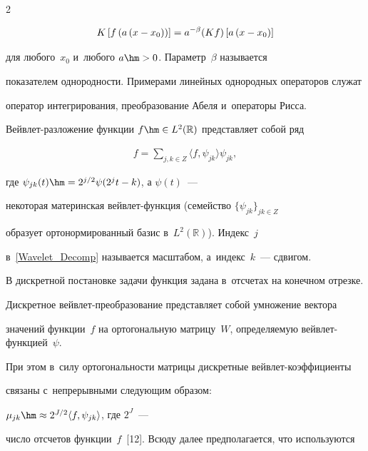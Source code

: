 \begin{multicols}{2}
  

 

  

  \noindent

\begin{equation}

K\left[f\left(a\left(x-x_0\right)\right)\right]=a^{-\beta}(Kf)\left[a\left(x-x_0\right)\right]\notag

\end{equation}

для любого~$x_0$ и~любого $a\hm>0$. Параметр~$\beta$ называется 

показателем однородности. Примерами линейных однородных операторов служат 

оператор интегрирования, преобразование Абеля и~операторы Рисса.



 Вейвлет-разложение функции $f\hm\in L^2(\mathbb{R})$ представляет собой ряд

\begin{align}

f=\sum\limits_{j,k\in Z}\langle f,\psi_{jk}\rangle\psi_{jk},

\label{Wavelet_Decomp}

\end{align}

где $\psi_{jk}(t)\hm=2^{j/2}\psi(2^jt-k)$, а $\psi(t)$~--- 

некоторая материнская вейв\-лет-функ\-ция (семейство $\{\psi_{jk}\}_{jk\in Z}$ 

образует ортонормированный базис в~$L^2(\mathbb{R})$). Индекс~$j$ 

в~\eqref{Wavelet_Decomp} называется масштабом, а~индекс~$k$~--- сдвигом.



В дискретной постановке задачи функция задана в~отсчетах на конечном отрезке. 

Дискретное вейв\-лет-пре\-обра\-зо\-ва\-ние представляет собой умножение вектора 

значений функции~$f$ на орто\-гональную матрицу~$W$, определяемую вейв\-лет-функ\-цией~$\psi$. 

При этом в~силу ортогональности матри\-цы дискретные вейв\-лет-ко\-эф\-фи\-ци\-ен\-ты 

\mbox{связаны} с~непрерывными следующим образом: 

$\mu_{jk}\hm\approx 2^{J/2}\langle f,\psi_{jk}\rangle$, где $2^J$~--- 

число отсчетов функции~$f$~[12]. Всюду далее предполагается, что используются 


\end{multicols}
